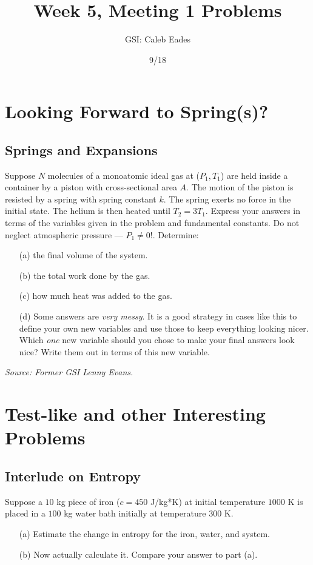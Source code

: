 \documentclass{article}
\begin{document}
\title{Week 5, Meeting 1 Problems}
\author{GSI: Caleb Eades}
\date{9/18}
\maketitle

\section{Looking Forward to Spring(s)?}

\subsection{Springs and Expansions}

Suppose $N$ molecules of a monoatomic ideal gas at ($P_1, T_1$) are held inside a container by a piston with cross-sectional area $A$.  The motion of the piston is resisted by a spring with spring constant $k$. The spring exerts no force in the initial state. The helium is then heated until $T_2 = 3 T_1$. Express your answers in terms of the variables given in the problem and fundamental constants. Do not neglect atmospheric pressure --- $P_1 \neq 0$!. Determine:
\begin{itemize}
	\item[(a)] the final volume of the system.
	\item[(b)] the total work done by the gas.
	\item[(c)] how much heat was added to the gas.
	\item[(d)] Some answers are \textit{very messy}. It is a good strategy in cases like this to define your own new variables and use those to keep everything looking nicer. Which \textit{one} new variable should you chose to make your final answers look nice? Write them out in terms of this new variable.
\end{itemize}

\textit{Source: Former GSI Lenny Evans.}

\section{Test-like and other Interesting Problems}

\subsection{Interlude on Entropy}

Suppose a $10$ kg piece of iron ($c=450$ J/kg*K) at initial temperature $1000$ K is placed in a $100$ kg water bath initially at temperature $300$ K.
\begin{itemize}
	\item[(a)] Estimate the change in entropy for the iron, water, and system.
	\item[(b)] Now actually calculate it. Compare your answer to part (a).
\end{itemize}
\end{document}
